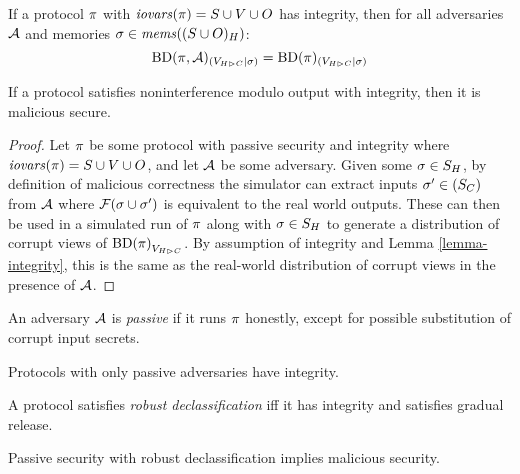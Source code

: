 \begin{lemma}
  \label{lemma-integrity}
  If a protocol $\pi$ with $\mathit{iovars}(\pi) = S \cup V \cup O$ has
  integrity, then for all adversaries $\mathcal{A}$
  and memories $\sigma \in \mathit{mems}((S \cup O)_H)$:
  $$
  \mathrm{BD}(\pi,\mathcal{A})_{({V_{H \rhd C}}|{\sigma})} =
  \mathrm{BD}(\pi)_{({V_{H \rhd C}}|{\sigma})}
  $$
\end{lemma}

\begin{theorem}
  If a protocol satisfies noninterference modulo output with
  integrity, then it is malicious secure.
\end{theorem}

\begin{proof}
  Let $\pi$ be some protocol with passive security and integrity
  where $\mathit{iovars}(\pi) = S \cup V \cup O$, and let $\mathcal{A}$ be some
  adversary.  Given some $\sigma\in S_H$, by definition of malicious
  correctness the simulator can extract inputs $\sigma' \in (S_C)$
  from $\mathcal{A}$ where $\mathcal{F}(\sigma \cup \sigma')$ is equivalent
  to the real world outputs. These can then be used in a simulated run
  of $\pi$ along with $\sigma \in S_H$ to generate a distribution
  of corrupt views of ${\mathrm{BD}(\pi)}_{V_{H \rhd C}}$.
  By assumption of integrity and Lemma \ref{lemma-integrity},
  this is the same as the real-world distribution of corrupt views
  in the presence of $\mathcal{A}$. 
\end{proof}

\begin{definition}
  An adversary $\mathcal{A}$ is \emph{passive} if it runs $\pi$ honestly,
  except for possible substitution of corrupt input secrets.
\end{definition}

\begin{lemma}
  Protocols with only passive adversaries have integrity.
\end{lemma}

\begin{definition}
  A protocol satisfies \emph{robust declassification} iff it has integrity and
  satisfies gradual release. 
\end{definition}

\begin{theorem}
  Passive security with robust declassification implies malicious security.
\end{theorem}
